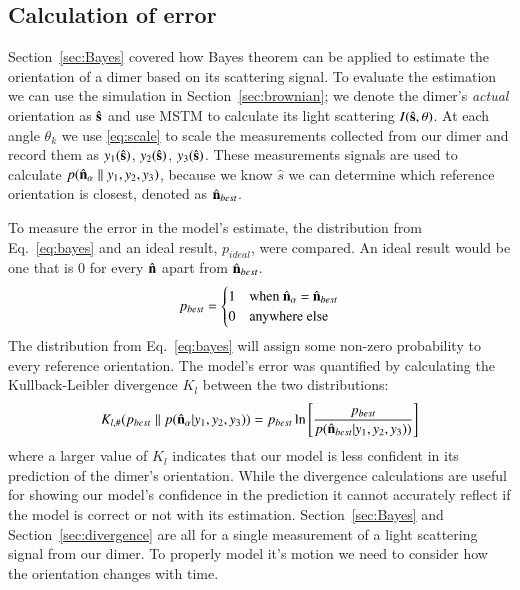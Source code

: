 \documentclass[final,  3p]{elsarticle}
\begin{document}
\subsection{Calculation of error
\label{sec:divergence}}


Section~\ref{sec:Bayes} covered how Bayes theorem can be applied to estimate
the orientation of a dimer based on its scattering signal. To evaluate the estimation we can use the simulation in Section~\ref{sec:brownian}; we denote the dimer's \emph{actual} orientation as $\hat{\bf s}$ and use MSTM to calculate its light scattering $I(\hat{\bf s}, \theta)$. At each angle $\theta_k$ we use \eqref{eq:scale} to scale the measurements collected from our dimer and record them as $y_1(\hat{\bf s})$, $y_2(\hat{\bf s})$, $y_3(\hat{\bf s})$. These measurements signals are used to calculate $p(\hat{\bf n}_{\alpha}\parallel y_1, y_2, y_3)$, because we know $\hat{s}$ we can determine which reference orientation is closest, denoted as $\hat{\bf n}_{best}$.

To measure the error in the model's estimate, the distribution from
Eq.~\eqref{eq:bayes} and an ideal result, $p_{ideal}$, were compared.
An ideal result would be one that is 0 for every $\hat{\bf n}$ apart
from $\hat{\bf n}_{best}$.
\begin{align}
\label{eq:best}
p_{best} = 
\begin{cases}
1 & \text{when $\hat{\bf n}_\alpha$ = $\hat{\bf n}_{best}$} \\
0 & \text{anywhere else}
\end{cases}
\end{align}
The distribution from Eq.~\eqref{eq:bayes} will assign some non-zero
probability to every reference orientation. The model's error was
quantified by calculating the Kullback-Leibler divergence $K_l$
between the two distributions:
\begin{align}
K_{l, \#}(p_{best}\parallel p(\hat{\bf n}_\alpha| y_1, y_2, y_3))
= p_{best}\ln \left[\frac{p_{best}}{p(\hat{\bf n}_{best}| y_1,y_2,y_3))}
\right]
\label{eq;kullback}
\end{align}
where a larger value of $K_l$ indicates that our model is less
confident in its prediction of the dimer's orientation. While the
divergence calculations are useful for showing our model's confidence
in the prediction it cannot accurately reflect if the model is correct
or not with its estimation.  Section~\ref{sec:Bayes} and
Section~\ref{sec:divergence} are all for a single measurement of a
light scattering signal from our dimer.  To properly model it's motion
we need to consider how the orientation changes with time.
\end{document}
